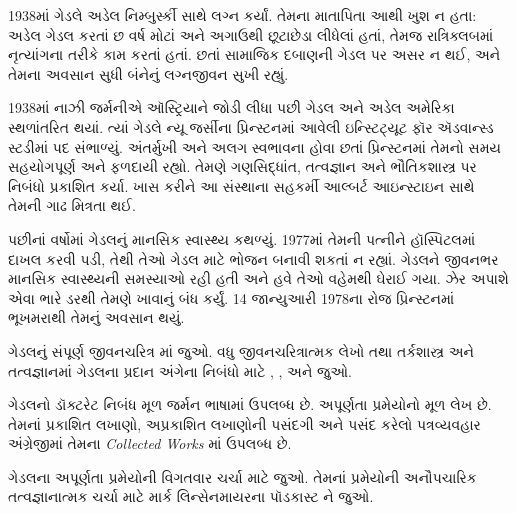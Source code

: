 1938માં ગેડલે અડેલ નિમ્બુર્સ્કી સાથે
લગ્ન કર્યાં. તેમના માતાપિતા આથી ખુશ
ન હતા: અડેલ ગેડલ કરતાં છ વર્ષ મોટાં
અને અગાઉથી છૂટાછેડા લીધેલાં હતાં,
તેમજ રાત્રિક્લબમાં નૃત્યાંગના તરીકે
કામ કરતાં હતાં. છતાં સામાજિક દબાણની
ગેડલ પર અસર ન થઈ, અને તેમના
અવસાન સુધી બંનેનું લગ્નજીવન સુખી રહ્યું.

1938માં નાઝી જર્મનીએ ઑસ્ટ્રિયાને
જોડી લીધા પછી ગેડલ અને અડેલ
અમેરિકા સ્થળાંતરિત થયાં. ત્યાં ગેડલે
ન્યૂ જર્સીના પ્રિન્સ્ટનમાં આવેલી
ઇન્સ્ટિટ્યૂટ ફૉર ઍડવાન્સ્ડ સ્ટડીમાં
પદ સંભાળ્યું. અંતર્મુખી અને
અલગ સ્વભાવના હોવા છતાં પ્રિન્સ્ટનમાં
તેમનો સમય સહયોગપૂર્ણ અને ફળદાયી રહ્યો.
તેમણે ગણસિદ્ધાંત, તત્વજ્ઞાન અને
ભૌતિકશાસ્ત્ર પર નિબંધો પ્રકાશિત કર્યા.
ખાસ કરીને આ સંસ્થાના સહકર્મી
આલ્બર્ટ આઇન્સ્ટાઇન સાથે તેમની
ગાઢ મિત્રતા થઈ.

પછીનાં વર્ષોમાં ગેડલનું માનસિક સ્વાસ્થ્ય
કથળ્યું. 1977માં તેમની પત્નીને
હૉસ્પિટલમાં દાખલ કરવી પડી, તેથી
તેઓ ગેડલ માટે ભોજન બનાવી શકતાં
ન રહ્યાં.
ગેડલને જીવનભર માનસિક સ્વાસ્થ્યની
સમસ્યાઓ રહી હતી અને હવે તેઓ
વહેમથી ઘેરાઈ ગયા. ઝેર અપાશે
એવા ભારે ડરથી તેમણે ખાવાનું
બંધ કર્યું. 14 જાન્યુઆરી 1978ના
રોજ પ્રિન્સ્ટનમાં ભૂખમરાથી
તેમનું અવસાન થયું.


\begin{reading}
ગેડલનું સંપૂર્ણ જીવનચરિત્ર
\citet{Dawson1997}માં જુઓ. વધુ જીવનચરિત્રાત્મક
લેખો તથા તર્કશાસ્ત્ર અને તત્વજ્ઞાનમાં
ગેડલના પ્રદાન અંગેના નિબંધો માટે
\citet{Wang1990}, \citet{Baaz2011},
\citet{Takeuti2003} અને \citet{Sigmund2007} જુઓ.

ગેડલનો ડૉક્ટરેટ નિબંધ મૂળ જર્મન
ભાષામાં \citep{Godel1929} ઉપલબ્ધ છે.
અપૂર્ણતા પ્રમેયોનો મૂળ લેખ
\citep{Godel1931} છે. તેમનાં
પ્રકાશિત લખાણો, અપ્રકાશિત લખાણોની
પસંદગી અને પસંદ કરેલો પત્રવ્યવહાર
અંગ્રેજીમાં તેમના
\emph{Collected Works}
\citet{Godel1986,Godel1990}માં ઉપલબ્ધ છે.

ગેડલના અપૂર્ણતા પ્રમેયોની
વિગતવાર ચર્ચા માટે
\citet{Smith2013} જુઓ.
તેમનાં પ્રમેયોની અનૌપચારિક
તત્વજ્ઞાનાત્મક ચર્ચા માટે
માર્ક લિન્સેનમાયરના પૉડકાસ્ટ
\citep{Linsenmayer2014}ને જુઓ.
\end{reading}
\endgroup


\begingroup
\makeatletter{}\makeatother


